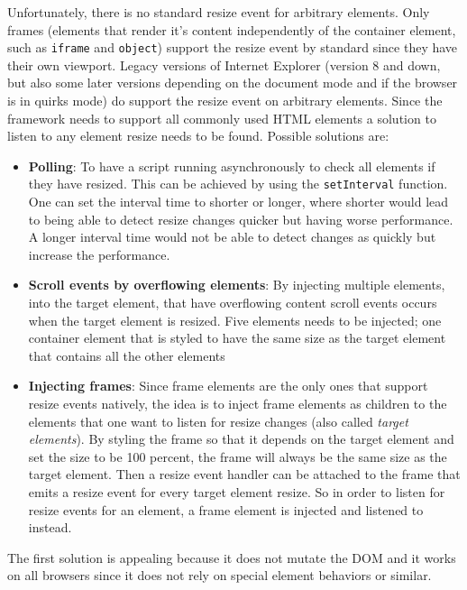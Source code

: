 \documentclass[a4paper,11pt]{kth-mag}
\newcommand{\code}[1]{\texttt{#1}}
\newcommand\abbr[2][]{\uppercase{#2}\ifthenelse{\equal{#1}{}}%
                     {}{#1}}
\begin{document}
          Unfortunately, there is no standard resize event for arbitrary elements.
          Only frames (elements that render it's content independently of the container element, such as \code{iframe} and \code{object}) support the resize event by standard since they have their own viewport.
          Legacy versions of Internet Explorer (version 8 and down, but also some later versions depending on the document mode and if the browser is in quirks mode) do support the resize event on arbitrary elements.
          Since the framework needs to support all commonly used \abbr{html} elements a solution to listen to any element resize needs to be found.
          Possible solutions are:
          \begin{itemize}
            \item \textbf{Polling}:
              To have a script running asynchronously to check all elements if they have resized.
              This can be achieved by using the \code{setInterval} function.
              One can set the interval time to shorter or longer, where shorter would lead to being able to detect resize changes quicker but having worse performance.
              A longer interval time would not be able to detect changes as quickly but increase the performance.
            \item \textbf{Scroll events by overflowing elements}:
              By injecting multiple elements, into the target element, that have overflowing content scroll events occurs when the target element is resized.
              Five elements needs to be injected; one container element that is styled to have the same size as the target element that contains all the other elements
            \item \textbf{Injecting frames}:
              Since frame elements are the only ones that support resize events natively, the idea is to inject frame elements as children to the elements that one want to listen for resize changes (also called \emph{target elements}).
              By styling the frame so that it depends on the target element and set the size to be 100 percent, the frame will always be the same size as the target element.
              Then a resize event handler can be attached to the frame that emits a resize event for every target element resize.
              So in order to listen for resize events for an element, a frame element is injected and listened to instead.
          \end{itemize}
          The first solution is appealing because it does not mutate the \abbr{dom} and it works on all browsers since it does not rely on special element behaviors or similar.
\end{document}
